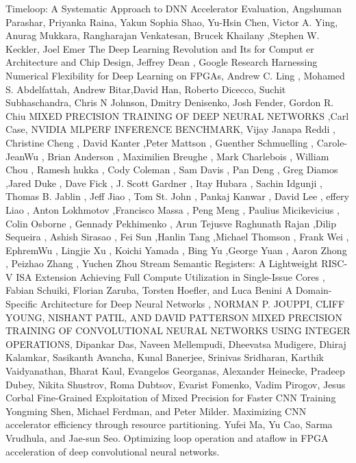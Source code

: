 \begin{thebibliography}{69}
 Timeloop: A Systematic Approach to DNN Accelerator Evaluation, Angshuman Parashar, Priyanka Raina, Yakun Sophia Shao, Yu-Hsin Chen, Victor A. Ying, Anurag Mukkara, Rangharajan Venkatesan, Brucek Khailany ,Stephen W. Keckler, Joel Emer
 The Deep Learning Revolution and Its for Comput er Architecture and Chip Design, Jeffrey Dean , Google Research
 Harnessing Numerical Flexibility for Deep Learning on FPGAs, Andrew C. Ling , Mohamed S. Abdelfattah, Andrew Bitar,David Han, Roberto Dicecco, Suchit Subhaschandra, Chris N Johnson, Dmitry Denisenko, Josh Fender, Gordon R. Chiu
  MIXED PRECISION TRAINING OF DEEP NEURAL NETWORKS ,Carl Case, NVIDIA
 MLPERF INFERENCE BENCHMARK, Vijay Janapa Reddi , Christine Cheng , David Kanter ,Peter Mattson , Guenther Schmuelling , Carole-JeanWu , Brian Anderson , Maximilien Breughe , Mark Charlebois , William Chou , Ramesh   hukka , Cody Coleman , Sam Davis , Pan Deng , Greg Diamos ,Jared Duke , Dave Fick , J. Scott Gardner , Itay Hubara , Sachin Idgunji , Thomas B. Jablin , Jeff Jiao , Tom St. John , Pankaj Kanwar , David Lee ,  effery Liao , Anton Lokhmotov ,Francisco Massa , Peng Meng , Paulius Micikevicius , Colin Osborne , Gennady Pekhimenko , Arun Tejusve Raghunath Rajan ,Dilip Sequeira , Ashish Sirasao , Fei Sun ,Hanlin Tang  ,Michael Thomson , Frank Wei , EphremWu , Lingjie Xu , Koichi Yamada , Bing Yu ,George Yuan , Aaron Zhong , Peizhao Zhang , Yuchen Zhou 
 Stream Semantic Registers: A Lightweight RISC-V ISA Extension Achieving Full Compute Utilization in Single-Issue Cores , Fabian Schuiki, Florian Zaruba, Torsten Hoefler, and Luca Benini
 A Domain-Specific Architecture for Deep Neural Networks , NORMAN P. JOUPPI, CLIFF YOUNG, NISHANT PATIL, AND DAVID PATTERSON
 MIXED PRECISION TRAINING OF CONVOLUTIONAL NEURAL NETWORKS USING INTEGER OPERATIONS, Dipankar Das, Naveen Mellempudi, Dheevatsa Mudigere, Dhiraj Kalamkar, Sasikanth Avancha, Kunal Banerjee, Srinivas Sridharan, Karthik Vaidyanathan, Bharat Kaul, Evangelos Georganas, Alexander Heinecke, Pradeep Dubey, Nikita Shustrov, Roma Dubtsov, Evarist Fomenko, Vadim Pirogov, Jesus Corbal
 Fine-Grained Exploitation of Mixed Precision for Faster CNN Training
 Yongming Shen, Michael Ferdman, and Peter Milder. Maximizing CNN  accelerator  efficiency through resource partitioning.
 Yufei Ma, Yu Cao, Sarma Vrudhula, and Jae-sun Seo. Optimizing loop operation and ataflow in FPGA acceleration of deep convolutional neural networks.

\end{thebibliography}
